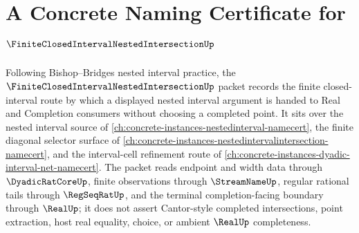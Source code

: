 \chapter{A Concrete Naming Certificate for $\FiniteClosedIntervalNestedIntersectionUp$}
\label{ch:concrete-instances-finite-closed-interval-nested-intersection-namecert}

Following Bishop--Bridges nested interval practice, the $\FiniteClosedIntervalNestedIntersectionUp$ packet records the finite closed-interval route by which a displayed nested interval argument is handed to Real and Completion consumers without choosing a completed point. It sits over the nested interval source of \autoref{ch:concrete-instances-nestedinterval-namecert}, the finite diagonal selector surface of \autoref{ch:concrete-instances-nestedintervalintersection-namecert}, and the interval-cell refinement route of \autoref{ch:concrete-instances-dyadic-interval-net-namecert}. The packet reads endpoint and width data through $\DyadicRatCoreUp$, finite observations through $\StreamNameUp$, regular rational tails through $\RegSeqRatUp$, and the terminal completion-facing boundary through $\RealUp$; it does not assert Cantor-style completed intersections, point extraction, host real equality, choice, or ambient $\RealUp$ completeness.

